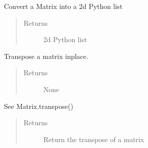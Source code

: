 \documentclass[letterpaper,10pt,english]{sphinxmanual}
\begin{document}
\begin{fulllineitems}
\begin{fulllineitems}
\begin{quote}
\begin{description}
\end{description}\end{quote}

\end{fulllineitems}


\begin{fulllineitems}
\label{\detokenize{libpymath.matrix:libpymath.matrix.matrix.Matrix.toList}}
Convert a Matrix into a 2d Python list
\begin{quote}\begin{description}
\item[{Returns}] \leavevmode
2d Python list

\end{description}\end{quote}

\end{fulllineitems}


\begin{fulllineitems}
\label{\detokenize{libpymath.matrix:libpymath.matrix.matrix.Matrix.transpose}}
Transpose a matrix inplace.
\begin{quote}\begin{description}
\item[{Returns}] \leavevmode
None

\end{description}\end{quote}

\end{fulllineitems}


\begin{fulllineitems}
\label{\detokenize{libpymath.matrix:libpymath.matrix.matrix.Matrix.transposed}}
See Matrix.transpose()
\begin{quote}\begin{description}
\item[{Returns}] \leavevmode
Return the transpose of a matrix

\end{description}\end{quote}

\end{fulllineitems}


\end{fulllineitems}
\end{document}
